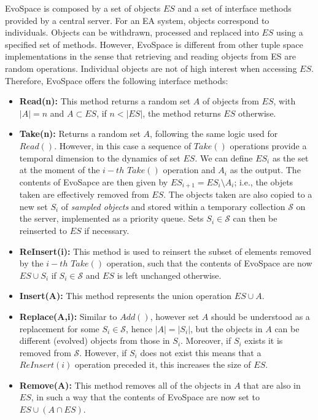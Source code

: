 EvoSpace is composed by a set of objects $ES$ and a set of interface methods provided by a central server.
For an EA system, objects correspond to individuals.
Objects can be withdrawn, processed and replaced into $ES$ using a specified set of methods.
However, EvoSpace is different from other tuple space implementations in the sense that retrieving and reading objects from ES are random operations.
Individual objects are not of high interest when accessing $ES$.
Therefore, EvoSpace offers the following interface methods:

\begin{itemize}
 \item \textbf{Read(n):} This method returns a random set $A$ of objects from $ES$, with $|A|=n$ and $A\subset ES$, if $n< |ES|$, the method returns $ES$ otherwise.

 \item \textbf{Take(n):} Returns a random set $A$, following the same logic used for $Read()$.
However, in this case a sequence of $Take()$ operations provide a temporal dimension to the dynamics of set $ES$.
We can define $ES_i$ as the set at the moment of the $i-th$ $Take()$ operation and $A_i$ as the output.
The contents of EvoSapce are then given by $ES_{i+1}= ES_i \setminus A_i$; i.e., the objets taken are effectively removed from $ES$.
The objects taken are also copied to a new set $S_i$ of \emph{sampled objects} and stored
within a temporary collection $\mathcal{S}$ on the server, implemented as a priority queue.
Sets $S_i \in \mathcal{S}$ can then be reinserted to $ES$ if necessary.

 \item \textbf{ReInsert(i):} This method is used to reinsert the subset of elements removed by the $i-th$ $Take()$ operation,
  such that the contents of EvoSpace are now $ES \cup S_i$ if $S_i \in \mathcal{S}$ and $ES$ is left unchanged otherwise.

 \item \textbf{Insert(A):} This method represents the union operation $ES \cup A$.

 \item \textbf{Replace(A,i):} Similar to $Add()$, however set $A$ should be understood as a replacement for
  some $S_i \in \mathcal{S}$, hence $|A| = |S_i|$, but the objects in $A$ can be different (evolved) objects from those in $S_i$.
  Moreover, if $S_i$ exists it is removed from $\mathcal{S}$.
  However, if $S_i$ does not exist this means that a $ReInsert(i)$ operation preceded it, this increases the size of $ES$.

 \item \textbf{Remove(A):} This method removes all of the objects in $A$ that are also in $ES$, in such a way that
  the contents of EvoSpace are now set to $ES \cup (A\cap ES)$.
\end{itemize}

